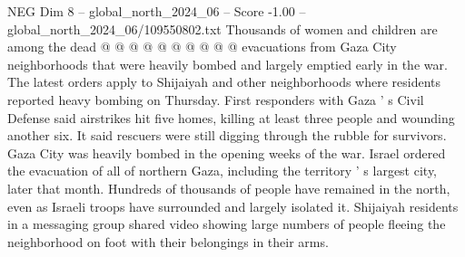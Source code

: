 \begin{textsample}{NEG Dim 8 – global\_north\_2024\_06 – Score -1.00 – global\_north\_2024\_06/109550802.txt}
Thousands of women and children are among the dead @ @ @ @ @ @ @ @ @ @ evacuations from Gaza City neighborhoods that were heavily bombed and largely emptied early in the war.
The latest orders apply to Shijaiyah and other neighborhoods where residents reported heavy bombing on Thursday.
First responders with Gaza ' s Civil Defense said airstrikes hit five homes, killing at least three people and wounding another six.
It said rescuers were still digging through the rubble for survivors.
Gaza City was heavily bombed in the opening weeks of the war.
Israel ordered the evacuation of all of northern Gaza, including the territory ' s largest city, later that month.
Hundreds of thousands of people have remained in the north, even as Israeli troops have surrounded and largely isolated it.
Shijaiyah residents in a messaging group shared video showing large numbers of people fleeing the neighborhood on foot with their belongings in their arms.

\end{textsample}
